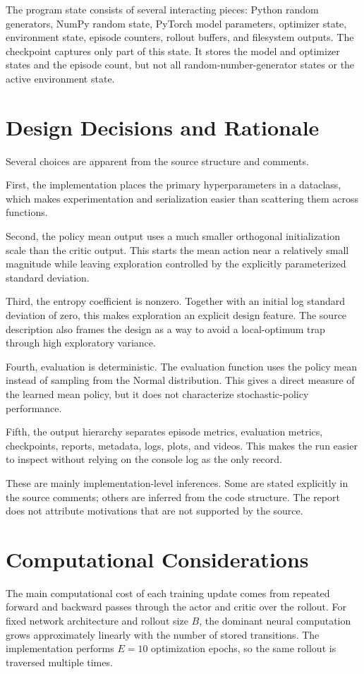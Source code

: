 \documentclass[11pt,a4paper]{article}
\begin{document}
The program state consists of several interacting pieces: Python random generators, NumPy random state, PyTorch model parameters, optimizer state, environment state, episode counters, rollout buffers, and filesystem outputs. The checkpoint captures only part of this state. It stores the model and optimizer states and the episode count, but not all random-number-generator states or the active environment state.

\section{Design Decisions and Rationale}
Several choices are apparent from the source structure and comments.

First, the implementation places the primary hyperparameters in a dataclass, which makes experimentation and serialization easier than scattering them across functions.

Second, the policy mean output uses a much smaller orthogonal initialization scale than the critic output. This starts the mean action near a relatively small magnitude while leaving exploration controlled by the explicitly parameterized standard deviation.

Third, the entropy coefficient is nonzero. Together with an initial log standard deviation of zero, this makes exploration an explicit design feature. The source description also frames the design as a way to avoid a local-optimum trap through high exploratory variance.

Fourth, evaluation is deterministic. The evaluation function uses the policy mean instead of sampling from the Normal distribution. This gives a direct measure of the learned mean policy, but it does not characterize stochastic-policy performance.

Fifth, the output hierarchy separates episode metrics, evaluation metrics, checkpoints, reports, metadata, logs, plots, and videos. This makes the run easier to inspect without relying on the console log as the only record.

These are mainly implementation-level inferences. Some are stated explicitly in the source comments; others are inferred from the code structure. The report does not attribute motivations that are not supported by the source.

\section{Computational Considerations}
The main computational cost of each training update comes from repeated forward and backward passes through the actor and critic over the rollout. For fixed network architecture and rollout size $B$, the dominant neural computation grows approximately linearly with the number of stored transitions. The implementation performs $E=10$ optimization epochs, so the same rollout is traversed multiple times.
\end{document}
